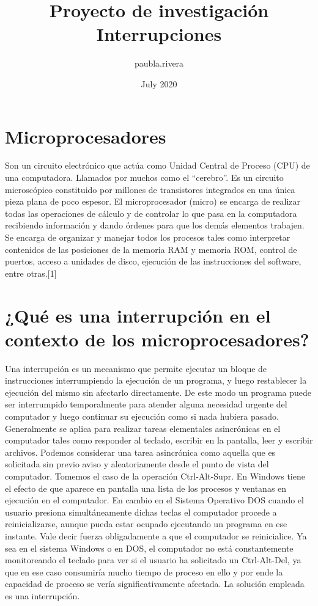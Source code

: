 \documentclass{article}
\title{Proyecto de investigación Interrupciones}
\author{paubla.rivera }
\date{July 2020}
\begin{document}
\maketitle

\section{Microprocesadores}
Son  un circuito electrónico que actúa como Unidad Central de Proceso (CPU) de una computadora. Llamados por muchos como el “cerebro”. Es un circuito microscópico constituido por millones de transistores integrados en una única pieza plana de poco espesor. El microprocesador (micro) se encarga de realizar todas las operaciones de cálculo y de controlar lo que pasa en la computadora recibiendo información y dando órdenes para que los demás elementos trabajen.
Se encarga de organizar y manejar todos los procesos tales como interpretar contenidos de las posiciones de la memoria RAM y memoria ROM, control de puertos, acceso a unidades de disco, ejecución de las instrucciones del software, entre otras.[1]


\section{¿Qué es una interrupción en el contexto de los microprocesadores?
}
Una interrupción es un mecanismo que permite ejecutar un bloque de instrucciones interrumpiendo la ejecución de un programa, y luego restablecer la ejecución del mismo sin afectarlo directamente. De este modo un programa puede ser interrumpido temporalmente para atender alguna necesidad urgente del computador y luego continuar su ejecución como si nada hubiera pasado.
Generalmente se aplica para realizar tareas elementales asincrónicas en el computador tales como responder al teclado, escribir en la pantalla, leer y escribir archivos. Podemos considerar una tarea asincrónica como aquella que es solicitada sin previo aviso y aleatoriamente desde el punto de vista del computador. Tomemos el caso de la operación Ctrl-Alt-Supr. En Windows tiene el efecto de que aparece en pantalla una lista de los procesos y ventanas en ejecución en el computador. En cambio en el Sistema Operativo DOS cuando el usuario presiona simultáneamente dichas teclas el computador procede a reinicializarse, aunque pueda estar ocupado ejecutando un programa en ese instante. Vale decir fuerza obligadamente a que el computador se reinicialice. Ya sea en el sistema Windows o en DOS, el computador no está constantemente monitoreando el teclado para ver si el usuario ha solicitado un Ctrl-Alt-Del, ya que en ese caso consumiría mucho tiempo de proceso en ello y por ende la capacidad de proceso se vería significativamente afectada. La solución empleada es una interrupción.
\end{document}
